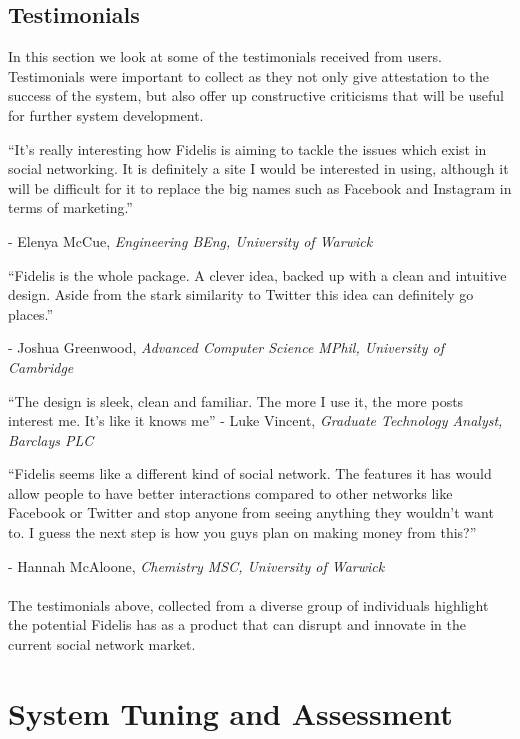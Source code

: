 \subsection{Testimonials}
In this section we look at some of the testimonials received from users. Testimonials were important to collect as they not only give attestation to the success of the system, but also offer up constructive criticisms that will be useful for further system development.

\begin{displayquote}
	\enquote{It's really interesting how Fidelis is aiming to tackle the issues which exist in social networking. It is definitely a site I would be interested in using, although it will be difficult for it to replace the big names such as Facebook and Instagram in terms of marketing.}
	
	- Elenya McCue, \textit{Engineering BEng, University of Warwick}
\end{displayquote}

\begin{displayquote}
	\enquote{Fidelis is the whole package. A clever idea, backed up with a clean and intuitive design. Aside from the stark similarity to Twitter this idea can definitely go places.}
	
	- Joshua Greenwood, \textit{Advanced Computer Science MPhil, University of Cambridge}
\end{displayquote}

\begin{displayquote}
	\enquote{The design is sleek, clean and familiar. The more I use it, the more posts interest me. It's like it knows me}	
	- Luke Vincent, \textit{Graduate Technology Analyst, Barclays PLC}
\end{displayquote}

\begin{displayquote}
	\enquote{Fidelis seems like a different kind of social network. The features it has would allow people to have better interactions compared to other networks like Facebook or Twitter and stop anyone from seeing anything they wouldn't want to. I guess the next step is how you guys plan on making money from this?}
\end{displayquote}

	- Hannah McAloone, \textit{Chemistry MSC, University of Warwick}
\\
\\
\noindent The testimonials above, collected from a diverse group of individuals highlight the potential Fidelis has as a product that can disrupt and innovate in the current social network market. 

\section{System Tuning and Assessment}